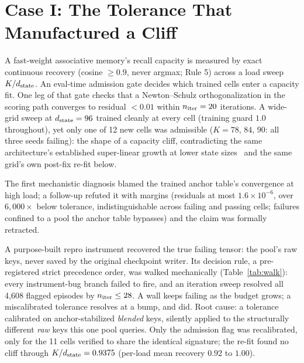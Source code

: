 \section{Case I: The Tolerance That Manufactured a Cliff}
\label{sec:tolerance}

A fast-weight associative memory's recall capacity is measured by
exact continuous recovery (cosine $\geq0.9$, never argmax; Rule 5)
across a load sweep $K/d_{\mathrm{state}}$. An eval-time admission gate decides
which trained cells enter a capacity fit. One leg of that gate checks
that a Newton--Schulz orthogonalization in the scoring path converges
to residual $<0.01$ within $n_{\mathrm{iter}}=20$ iterations. A wide-grid sweep at
$d_{\mathrm{state}}=96$ trained cleanly at every cell (training guard $1.0$
throughout), yet only one of 12 new cells was admissible
($K{=}78$, $84$, $90$: all three seeds
failing): the shape of a capacity cliff, contradicting the same
architecture's established super-linear growth at lower state
sizes~\citep{companion2026capacity} and the same grid's own post-fix
re-fit below.

The first mechanistic diagnosis blamed the trained anchor table's
convergence at high load; a follow-up refuted it with margins
(residuals at most $1.6\times10^{-6}$, over $6{,}000\times$ below
tolerance,
indistinguishable across failing and passing cells; failures confined
to a
pool the anchor table bypasses) and the claim was formally
retracted.

 A purpose-built repro instrument recovered the true failing
tensor: the pool's raw keys, never saved by the original checkpoint
writer. Its decision rule, a pre-registered strict precedence order,
was walked mechanically (Table~\ref{tab:walk}): every
instrument-bug branch failed to fire, and an iteration sweep resolved
all 4{,}608 flagged episodes by $n_{\mathrm{iter}}\le28$.
A wall keeps failing as the budget grows; a miscalibrated tolerance
resolves at a bump, and did. Root cause: a
tolerance calibrated on anchor-stabilized \emph{blended} keys,
silently applied to the structurally different \emph{raw} keys this
one pool queries. Only the admission flag was
recalibrated, only for the 11 cells verified to share the identical
signature; the re-fit found no cliff
through $K/d_{\mathrm{state}}=0.9375$ (per-load mean recovery $0.92$ to $1.00$).
